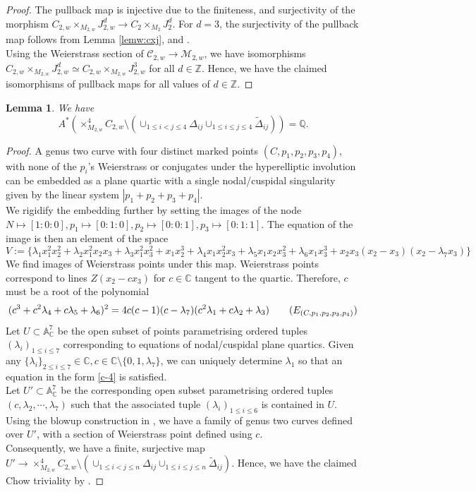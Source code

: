 \documentclass[11pt]{amsart}
\newcommand\Z{\mathbb{Z}}
\numberwithin{theorem}{section}
\newtheorem{lemma}{Lemma}
\numberwithin{lemma}{section}
\theoremstyle{definition}
\newcommand{\ri}{\rightarrow}
\newcommand{\K}{\mathbb{C}}
\newcommand{\Q}{\mathbb{Q}}
\newcommand{\la}{\lambda}
\begin{document}
\begin{proof}
	The pullback map is injective due to the finiteness, and surjectivity of the morphism
	$C_{2,w}\times_{M_{2,w}}J^d_{2,w}\ri C_2\times_{M_2}J^d_2$. 
	For $d=3$, the surjectivity of the pullback map follows from Lemma \ref{lemw:cxj}, and \cite[Theorem 4.4]{shubham-r2}.\\
	Using the Weierstrass section of $\mathcal{C}_{2,w}\ri\mathcal{M}_{2,w}$, we have isomorphisms $C_{2,w}\times_{M_{2,w}}J^d_{2,w}\simeq C_{2,w}\times_{M_{2,w}}J^3_{2,w}$ for all $d\in\Z$. 
	Hence, we have the claimed isomorphisms of pullback maps for all values of $d\in\Z$.
\end{proof}
\begin{lemma}\label{lem:c4}
	We have 
	$$A^*(\times_{M_{2,w}}^4C_{2,w}\setminus (\cup_{1\leq i<j\leq 4}\Delta_{ij}\cup_{1\leq i\leq j\leq 4}\tilde{\Delta}_{ij})) = \Q.$$
\end{lemma}
\begin{proof}
A genus two curve with four distinct marked points $(C,p_1,p_2,p_3,p_4)$, with none of the $p_i$’s Weierstrass or conjugates under the hyperelliptic involution can be embedded as a plane quartic with a single nodal/cuspidal singularity given by the linear system $|p_1+p_2+p_3+p_4|$.\\
We rigidify the embedding further by setting the images of the node $N\mapsto  [1 : 0 : 0],p_1\mapsto [0 : 1 : 0],p_2\mapsto [0 : 0 : 1],p_3 \mapsto [0 : 1 : 1]$. 
The equation of the image is then an element of the space
$$V := \{\la_1x_1^2x_2^2+\la_2x_1^2x_2x_3+\la_3x_1^2x_3^2+x_1x_2^3+\la_4x_1x_2^2x_3+\la_5x_1x_2x_3^2+\la_6x_1x_3^3+ x_2x_3(x_2-x_3)(x_2-\la_7x_3)\}$$
 We find images of Weierstrass points under this map. Weierstrass points correspond to lines $Z(x_2-cx_3)$ for $c\in \K$ tangent to the quartic. Therefore, $c$ must be a root of the polynomial 
 \begin{equation}\label{c-4}(c^3+c^2\la_4+c\la_5+\la_6)^2 = 4c(c-1)(c-\la_7)(c^2\la_1+c\la_2+\la_3)\tag{$E_{(C,p_1,p_2,p_3,p_4)}$}\end{equation} 
Let $U\subset \mathbb{A}_\K^7$ be the open subset of points parametrising ordered tuples $(\la_i)_{1\leq i\leq 7}$ corresponding to equations of nodal/cuspidal plane quartics.
Given any $\{\la_i\}_{2\leq i\leq 7}\in \K,c\in \K\setminus\{0,1,\la_7\}$, we can uniquely determine $\la_1$ so that an equation in the form \ref{c-4} is satisfied.\\
Let $U'\subset \mathbb{A}_\K^7$ be the corresponding open subset parametrising ordered tuples $(c,\la_2,\cdots,\la_7)$ such that the associated tuple $(\la_i)_{1\leq i\leq 6}$ is contained in $ U$.
Using the blowup construction in \cite[Lemma 3.4]{shubham-r2}, we have a family of genus two curves defined over $U'$, with a section of Weierstrass point defined using $c$.\\
Consequently, we have a finite, surjective map $U'\ri \times_{M_{2,w}}^4C_{2,w}\setminus (\cup_{1\leq i<j\leq n}\Delta_{ij}\cup_{1\leq i\leq j\leq n}\tilde{\Delta}_{ij})$. Hence, we have the claimed Chow triviality by \cite[Remark 2.2]{vakil}.
\end{proof}
\end{document}
